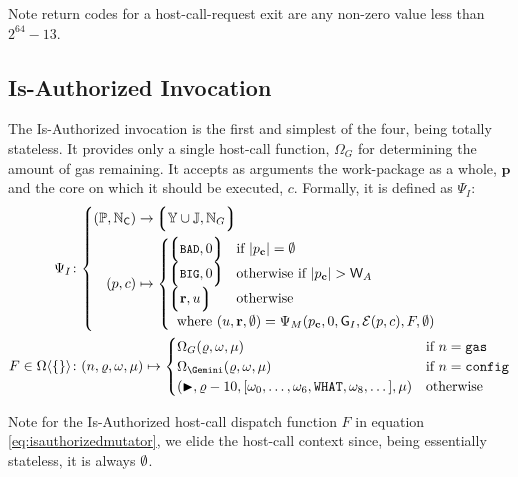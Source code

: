 Note return codes for a host-call-request exit are any non-zero value less than $2^{64} - 13$.

\subsection{Is-Authorized Invocation}\label{sec:isauthorizedinvocation}

\newcommand*{\wpX}{p}

The Is-Authorized invocation is the first and simplest of the four, being totally stateless. It provides only a single host-call function, $\Omega_G$ for determining the amount of gas remaining. It accepts as arguments the work-package as a whole, $\mathbf{p}$ and the core on which it should be executed, $c$. Formally, it is defined as $\Psi_I$:
\begin{align}
  \Psi_I &\colon \left\{\begin{aligned}
    (\mathbb{P}, \N_\mathsf{C}) &\to \tuple{\Y \cup \mathbb{J}, \N_G} \\
    (\wpX, c) &\mapsto \begin{cases}
      \tup{\token{BAD}, 0} &\when |\wpX_\mathbf{c}| = \none \\
      \tup{\token{BIG}, 0} &\otherwhen |\wpX_\mathbf{c}| > \mathsf{W}_A \\
      \tup{\mathbf{r}, u} &\otherwise \\
      \multicolumn{2}{l}{\where (u, \mathbf{r}, \none) = \Psi_M(\wpX_\mathbf{c}, 0, \mathsf{G}_I, \mathcal{E}(\wpX, c), F, \none)}\\
    \end{cases}\\
  \end{aligned}\right. \\
  \label{eq:isauthorizedmutator}F \in \Omega\ang{\{\}} &\colon
    (n, \gascounter, \registers, \memory) \mapsto \begin{cases}
      \Omega_G(\gascounter, \registers, \memory) &\when n = \mathtt{gas} \\
      \Omega_\Gemini(\gascounter, \registers, \memory) &\when n = \mathtt{config} \\
      (\continue, \gascounter - 10, [\registers_0, \dots, \registers_6, \mathtt{WHAT}, \registers_8, \dots], \memory) &\otherwise
    \end{cases}
\end{align}

Note for the Is-Authorized host-call dispatch function $F$ in equation \ref{eq:isauthorizedmutator}, we elide the host-call context since, being essentially stateless, it is always $\emptyset$.

